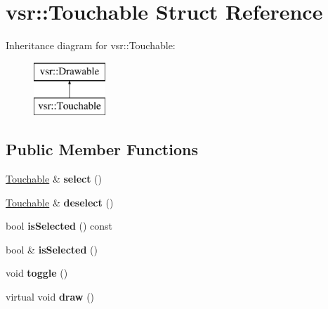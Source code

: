 \hypertarget{structvsr_1_1_touchable}{\section{vsr\-:\-:Touchable Struct Reference}
\label{structvsr_1_1_touchable}
}
Inheritance diagram for vsr\-:\-:Touchable\-:\begin{figure}[H]
\begin{center}
\leavevmode
\includegraphics[height=2.000000cm]{structvsr_1_1_touchable}
\end{center}
\end{figure}
\subsection*{Public Member Functions}
\begin{DoxyCompactItemize}
\item 
\hypertarget{structvsr_1_1_touchable_ad7bb0a8eb192537b63a490400c7a96e5}{\hyperlink{structvsr_1_1_touchable}{Touchable} \& {\bfseries select} ()}\label{structvsr_1_1_touchable_ad7bb0a8eb192537b63a490400c7a96e5}

\item 
\hypertarget{structvsr_1_1_touchable_accb9892753037ca53a51fd5b8878b6c8}{\hyperlink{structvsr_1_1_touchable}{Touchable} \& {\bfseries deselect} ()}\label{structvsr_1_1_touchable_accb9892753037ca53a51fd5b8878b6c8}

\item 
\hypertarget{structvsr_1_1_touchable_a8158e306a8fa6c2af43c5445a9210644}{bool {\bfseries is\-Selected} () const }\label{structvsr_1_1_touchable_a8158e306a8fa6c2af43c5445a9210644}

\item 
\hypertarget{structvsr_1_1_touchable_a8876714d909cf9ccda31364b49cb48ed}{bool \& {\bfseries is\-Selected} ()}\label{structvsr_1_1_touchable_a8876714d909cf9ccda31364b49cb48ed}

\item 
\hypertarget{structvsr_1_1_touchable_a4d371aee65ba342f73a6cd87cc1711e0}{void {\bfseries toggle} ()}\label{structvsr_1_1_touchable_a4d371aee65ba342f73a6cd87cc1711e0}

\item 
\hypertarget{structvsr_1_1_touchable_a57f986e1e21b196614b2a3a382433c05}{virtual void {\bfseries draw} ()}\label{structvsr_1_1_touchable_a57f986e1e21b196614b2a3a382433c05}

\end{DoxyCompactItemize}
